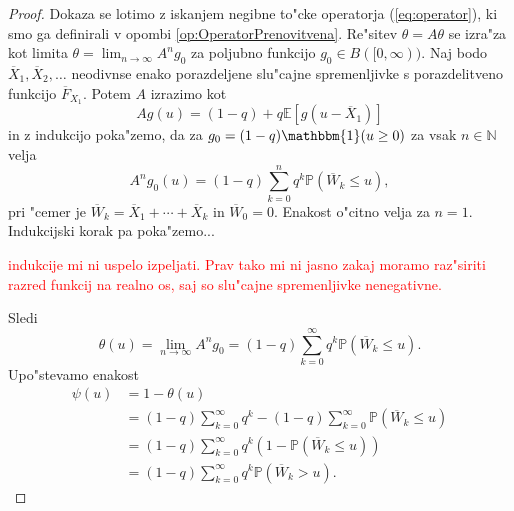 \documentclass[12pt, a4paper, reqno]{amsart}
\theoremstyle{definition}
\theoremstyle{plain}
\newcommand{\N}{\mathbb{N}}
\newcommand{\E}{\mathbb{E}}
\newcommand{\Prob}{\mathbb{P}}
\newcommand{\1}{\mathds{1}}
\begin{document}
        \begin{proof}
            Dokaza se lotimo z iskanjem negibne to"cke 
            operatorja (\ref{eq:operator}), ki smo ga definirali v opombi \ref{op:OperatorPrenovitvena}.
            Re"sitev $\theta = A\theta$ se izra"za kot limita $\theta = \lim_{n\to\infty}A^ng_0$ za 
            poljubno funkcijo $g_0\in B([0, \infty)).$ Naj bodo $\overline{X}_1, \overline{X}_2, \dots $ 
            neodivnse enako porazdeljene slu"cajne spremenljivke s porazdelitveno funkcijo $\overline{F}_{X_1}$.
            Potem $A$ izrazimo kot
            \begin{equation*}
                Ag(u) = (1 - q) + q\E\left[g(u - \overline{X}_1)\right]
            \end{equation*}
            in z indukcijo poka"zemo, da za $g_0 = (1 - q)\mathbbm{1}(u\geq0)$ za vsak $n\in\N$ velja
            \begin{equation*}
                A^ng_0(u) = (1 - q)\sum_{k = 0}^nq^k\Prob\left(\overline{W}_k \leq u\right),
            \end{equation*}
            pri "cemer je $\overline{W}_k = \overline{X}_1 + \cdots + \overline{X}_k$ in $\overline{W}_0 = 0$.
            Enakost o"citno velja za $n=1$. Indukcijski korak pa poka"zemo...
            \begin{center}
                \textcolor{red}{indukcije mi ni uspelo izpeljati. Prav tako mi ni 
                jasno zakaj moramo raz"siriti razred funkcij na realno os, saj so slu"cajne spremenljivke 
                nenegativne.}
            \end{center}
            Sledi 
            \begin{equation}
                \theta(u) = \lim_{n\to\infty} A^ng_0 = (1 - q)\sum_{k = 0}^\infty q^k\Prob\left(\overline{W}_k \leq u\right).
                \label{eq:bodocaGeometrijska}
            \end{equation}
            Upo"stevamo enakost
            \begin{align*}
                \psi(u) &= 1 - \theta(u)\\
                        &= (1 - q)\sum_{k = 0}^\infty q^k - (1 - q)\sum_{k = 0}^\infty \Prob\left(\overline{W}_k \leq u\right) \\
                        &= (1 - q)\sum_{k = 0}^\infty q^k\left(1 - \Prob\left(\overline{W}_k \leq u\right) \right)\\
                        &= (1 - q)\sum_{k = 0}^\infty q^k \Prob\left(\overline{W}_k > u\right).
            \end{align*}


\end{proof}
\end{document}
